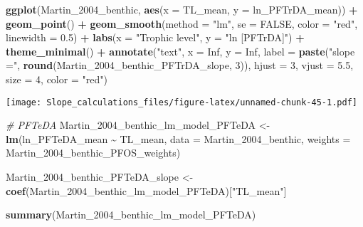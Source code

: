 \documentclass[
]{article}
\newenvironment{Shaded}{\begin{snugshade}}{\end{snugshade}}
\newcommand{\AttributeTok}[1]{\textcolor[rgb]{0.13,0.29,0.53}{#1}}
\newcommand{\CommentTok}[1]{\textcolor[rgb]{0.56,0.35,0.01}{\textit{#1}}}
\newcommand{\ConstantTok}[1]{\textcolor[rgb]{0.56,0.35,0.01}{#1}}
\newcommand{\DecValTok}[1]{\textcolor[rgb]{0.00,0.00,0.81}{#1}}
\newcommand{\FloatTok}[1]{\textcolor[rgb]{0.00,0.00,0.81}{#1}}
\newcommand{\FunctionTok}[1]{\textcolor[rgb]{0.13,0.29,0.53}{\textbf{#1}}}
\newcommand{\NormalTok}[1]{#1}
\newcommand{\OtherTok}[1]{\textcolor[rgb]{0.56,0.35,0.01}{#1}}
\newcommand{\SpecialCharTok}[1]{\textcolor[rgb]{0.81,0.36,0.00}{\textbf{#1}}}
\newcommand{\StringTok}[1]{\textcolor[rgb]{0.31,0.60,0.02}{#1}}
\begin{document}
\begin{Shaded}
\begin{Highlighting}[]
\FunctionTok{ggplot}\NormalTok{(Martin\_2004\_benthic, }\FunctionTok{aes}\NormalTok{(}\AttributeTok{x =}\NormalTok{ TL\_mean, }\AttributeTok{y =}\NormalTok{ ln\_PFTrDA\_mean)) }\SpecialCharTok{+}
  \FunctionTok{geom\_point}\NormalTok{() }\SpecialCharTok{+}
  \FunctionTok{geom\_smooth}\NormalTok{(}\AttributeTok{method =} \StringTok{"lm"}\NormalTok{, }\AttributeTok{se =} \ConstantTok{FALSE}\NormalTok{, }\AttributeTok{color =} \StringTok{"red"}\NormalTok{, }\AttributeTok{linewidth =} \FloatTok{0.5}\NormalTok{) }\SpecialCharTok{+}
  \FunctionTok{labs}\NormalTok{(}\AttributeTok{x =} \StringTok{"Trophic level"}\NormalTok{,}
       \AttributeTok{y =} \StringTok{"ln [PFTrDA]"}\NormalTok{) }\SpecialCharTok{+}
  \FunctionTok{theme\_minimal}\NormalTok{() }\SpecialCharTok{+}
  \FunctionTok{annotate}\NormalTok{(}\StringTok{"text"}\NormalTok{, }\AttributeTok{x =} \ConstantTok{Inf}\NormalTok{, }\AttributeTok{y =} \ConstantTok{Inf}\NormalTok{, }\AttributeTok{label =} \FunctionTok{paste}\NormalTok{(}\StringTok{"slope ="}\NormalTok{, }\FunctionTok{round}\NormalTok{(Martin\_2004\_benthic\_PFTrDA\_slope, }\DecValTok{3}\NormalTok{)), }
           \AttributeTok{hjust =} \DecValTok{3}\NormalTok{, }\AttributeTok{vjust =} \FloatTok{5.5}\NormalTok{, }\AttributeTok{size =} \DecValTok{4}\NormalTok{, }\AttributeTok{color =} \StringTok{"red"}\NormalTok{)}
\end{Highlighting}
\end{Shaded}

\texttt{[image: Slope\_calculations\_files/figure-latex/unnamed-chunk-45-1.pdf]}

\begin{Shaded}
\begin{Highlighting}[]
\CommentTok{\# PFTeDA}
\NormalTok{Martin\_2004\_benthic\_lm\_model\_PFTeDA }\OtherTok{\textless{}{-}} \FunctionTok{lm}\NormalTok{(ln\_PFTeDA\_mean }\SpecialCharTok{\textasciitilde{}}\NormalTok{ TL\_mean, }
                                        \AttributeTok{data =}\NormalTok{ Martin\_2004\_benthic,}
                                        \AttributeTok{weights =}\NormalTok{ Martin\_2004\_benthic\_PFOS\_weights)}

\NormalTok{Martin\_2004\_benthic\_PFTeDA\_slope }\OtherTok{\textless{}{-}} \FunctionTok{coef}\NormalTok{(Martin\_2004\_benthic\_lm\_model\_PFTeDA)[}\StringTok{"TL\_mean"}\NormalTok{]}

\FunctionTok{summary}\NormalTok{(Martin\_2004\_benthic\_lm\_model\_PFTeDA)}
\end{Highlighting}
\end{Shaded}
\end{document}
